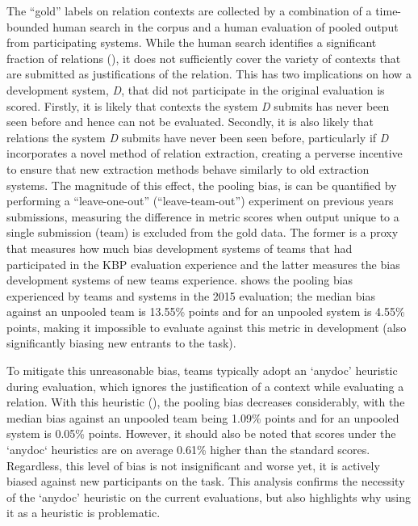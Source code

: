 The ``gold'' labels on relation contexts are collected by a combination of a time-bounded human search in the corpus and a human evaluation of pooled output from participating systems.
While the human search identifies a significant fraction of relations (),
  it does not sufficiently cover the variety of contexts that are submitted as justifications of the relation. 
This has two implications on how a development system, \textit{D}, that did not participate in the original evaluation is scored.
Firstly, it is likely that contexts the system \textit{D} submits has never been seen before and hence can not be evaluated.
Secondly, it is also likely that relations the system \textit{D} submits have never been seen before, particularly if \textit{D} incorporates a novel method of relation extraction, creating a perverse incentive to ensure that new extraction methods behave similarly to old extraction systems.
The magnitude of this effect, the pooling bias, is can be quantified by performing a ``leave-one-out'' (``leave-team-out'') experiment on previous years submissions, measuring the difference in metric scores when output unique to a single submission (team) is excluded from the gold data.
The former is a proxy that measures how much bias development systems of teams that had participated in the KBP evaluation experience and the latter measures the bias development systems of new teams experience.
 shows the pooling bias experienced by teams and systems in the 2015 evaluation;
  the median bias against an unpooled team is 13.55\% \fone{} points and for an unpooled system is 4.55\% \fone{} points,
  making it impossible to evaluate against this metric in development (also significantly biasing new entrants to the task).

To mitigate this unreasonable bias, teams typically adopt an `anydoc' heuristic during evaluation, which ignores the justification of a context while evaluating a relation.
With this heuristic (), the pooling bias decreases considerably, with 
  the median bias against an unpooled team being 1.09\% \fone{} points and for an unpooled system is 0.05\% \fone{} points.
However, it should also be noted that scores under the `anydoc` heuristics are on average 0.61\% higher than the standard scores.
Regardless, this level of bias is not insignificant and worse yet, it is actively biased against new participants on the task.
This analysis confirms the necessity of the `anydoc' heuristic on the current evaluations, but also highlights why using it as a heuristic is problematic.

